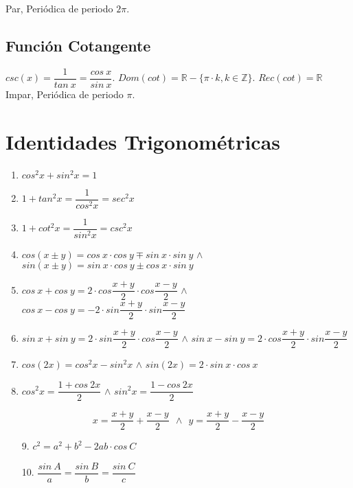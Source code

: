 \documentclass[11pt,a4paper]{article}
\begin{document}
\noindent Par, Peri\'odica de periodo $2\pi$.

\subsection{Funci\'on Cotangente}
\noindent $csc(x) = \dfrac{1}{tan\ x} = \dfrac{cos\ x}{sin\ x}$. $Dom(cot) = \mathbb{R} - \{\pi \cdot k, k\in \mathbb{Z}\}$. $Rec(cot) = \mathbb{R}$\\

\noindent Impar, Peri\'odica de periodo $\pi$.

\newpage

\section{Identidades Trigonom\'etricas}
\begin{enumerate}
\item $cos^2x + sin^2x = 1$
\item $1 + tan^2x = \dfrac{1}{cos^2x} = sec^2x$
\item $1+cot^2x = \dfrac{1}{sin^2x} = csc^2x$
\item $cos(x \pm y) = cos\ x \cdot cos\ y \mp sin\ x \cdot sin\ y$ $\land$ $sin(x \pm y) = sin\ x \cdot cos\ y \pm cos\ x \cdot sin\ y$
\item $cos\ x + cos\ y = 2\cdot cos\dfrac{x+y}{2} \cdot cos\dfrac{x-y}{2}$ $\land$ $cos\ x - cos\ y = -2 \cdot sin\dfrac{x+y}{2} \cdot sin \dfrac{x-y}{2}$
\item $sin\ x + sin\ y = 2\cdot sin \dfrac{x+y}{2} \cdot cos\dfrac{x-y}{2}$ $\land$ $sin\ x - sin\ y = 2 \cdot cos \dfrac{x+y}{2} \cdot sin \dfrac{x-y}{2}$
\item $cos(2x) = cos^2x-sin^2x$ $\land$ $sin(2x)=2\cdot sin\ x \cdot cos\ x$
\item $cos^2x = \dfrac{1+cos\ 2x}{2}$ $\land$ $sin^2x=\dfrac{1-cos\ 2x}{2}$
\end{enumerate}
$$x = \dfrac{x+y}{2} + \dfrac{x-y}{2}\ \ \land \ \ y = \dfrac{x+y}{2}-\dfrac{x-y}{2}$$
\begin{enumerate}
\item[9.] $c^2 = a^2 + b^2 - 2ab\cdot cos\ C$
\item[10.] $\dfrac{sin\ A}{a} = \dfrac{sin\ B}{b} = \dfrac{sin\ C}{c}$
\end{enumerate}
\end{document}
